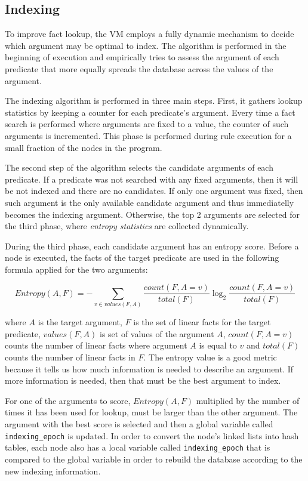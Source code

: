 
\subsection{Indexing}\label{sec:implementation:indexing}

To improve fact lookup, the VM employs a fully dynamic mechanism to
decide which argument may be optimal to index.  The algorithm is
performed in the beginning of execution and empirically tries to
assess the argument of each predicate that more equally spreads the
database across the values of the argument. 

The indexing algorithm is performed in three main steps. First, it
gathers lookup statistics by keeping a counter for each
predicate's argument.  Every time a fact search is performed where
arguments are fixed to a value, the counter of such arguments is
incremented. This phase is performed during rule execution for a small
fraction of the nodes in the program.

The second step of the algorithm selects the candidate arguments of each
predicate.  If a predicate was not searched with any fixed arguments, then it
will be not indexed and there are no candidates.  If only one argument was
fixed, then such argument is the only available candidate argument and thus
immediatelly becomes the indexing argument. Otherwise, the top 2 arguments are
selected for the third phase, where \emph{entropy statistics} are collected
dynamically.

During the third phase, each candidate argument has an entropy score.
Before a node is executed, the facts of the target predicate
are used in the following formula applied for the two arguments:

\[
Entropy(A, F) = - \sum_{v \in values(F, A)} \frac{count(F, A = v)}{total(F)} \log_2 \frac{count(F, A = v)}{total(F)}
\]

\noindent where $A$ is the target argument, $F$ is the set of linear facts for
the target predicate, $values(F, A)$ is set of values of the argument $A$,
$count(F, A = v)$ counts the number of linear facts where argument $A$ is equal
to $v$ and $total(F)$ counts the number of linear facts in $F$.  The entropy
value is a good metric because it tells us how much information is needed to
describe an argument. If more information is needed, then that must be the best
argument to index.

For one of the arguments to score, $Entropy(A, F)$ multiplied by the number of
times it has been used for lookup, must be larger than the other argument. The
argument with the best score is selected and then a global variable called
\texttt{indexing\_epoch} is updated. In order to convert the node's linked lists
into hash tables, each node also has a local variable called
\texttt{indexing\_epoch} that is compared to the global variable in order to
rebuild the database according to the new indexing information.

